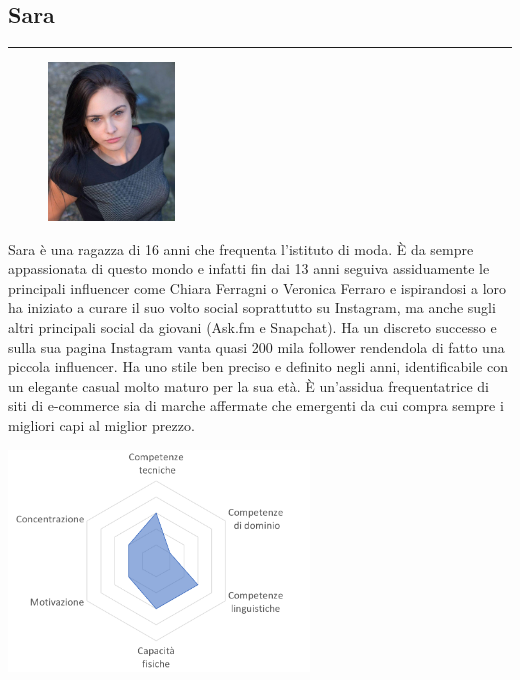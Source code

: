 \documentclass[12pt,a4paper]{report}
\begin{document}
\subsection*{Sara}
\rule{\textwidth}{0.5pt}
\begin{figure}
  \centering
  \includegraphics[width=0.3\textwidth]{"Images Latex/Personas/Sara"}
\end{figure}
Sara è una ragazza di 16 anni che frequenta l'istituto di moda. È  da sempre appassionata di questo mondo e infatti fin dai 13 anni seguiva assiduamente le principali influencer come Chiara Ferragni o Veronica Ferraro e ispirandosi a loro ha iniziato a curare il suo volto social soprattutto su Instagram, ma anche sugli altri principali social da giovani (Ask.fm e Snapchat). Ha un discreto successo e sulla sua pagina Instagram vanta quasi 200 mila follower rendendola di fatto una piccola influencer. Ha uno stile ben preciso e definito negli anni, identificabile con un elegante casual molto maturo per la sua età. È un'assidua frequentatrice di siti di e-commerce sia di marche affermate che emergenti da cui compra sempre i migliori capi al miglior prezzo.
\begin{center}
  \includegraphics[width=0.6\textwidth]{"Images Latex/Personas/Sara16"}
\end{center}
\newpage
\end{document}
